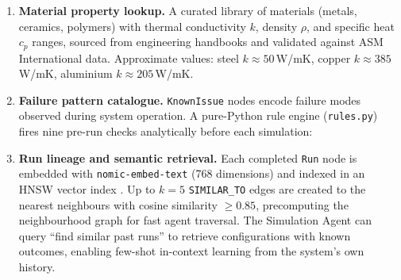 \documentclass[preprint,review,12pt]{elsarticle}
\begin{document}
\begin{enumerate}
  \item \textbf{Material property lookup.}  A curated library of materials
        (metals, ceramics, polymers) with thermal conductivity $k$,
        density $\rho$, and specific heat $c_p$ ranges, sourced from
        engineering handbooks and validated against ASM International data.
        Approximate values: steel $k \approx 50$\,W/mK, copper
        $k \approx 385$\,W/mK, aluminium $k \approx 205$\,W/mK.

  \item \textbf{Failure pattern catalogue.}  \texttt{KnownIssue} nodes
        encode failure modes observed during system operation.
        A pure-Python rule engine (\texttt{rules.py}) fires nine
        pre-run checks analytically before each simulation:

        \smallskip\par

  \item \textbf{Run lineage and semantic retrieval.}  Each completed
        \texttt{Run} node is embedded with \texttt{nomic-embed-text}
        \citep{nussbaum2024nomic} (768 dimensions) and indexed in an
        HNSW vector index \citep{malkov2020hnsw}.  Up to
        $k{=}5$ \texttt{SIMILAR\_TO} edges are created to the nearest
        neighbours with cosine similarity $\ge 0.85$, precomputing the
        neighbourhood graph for fast agent traversal.  The Simulation
        Agent can query ``find similar past runs'' to retrieve configurations
        with known outcomes, enabling few-shot in-context learning from
        the system's own history.
\end{enumerate}
\end{document}
